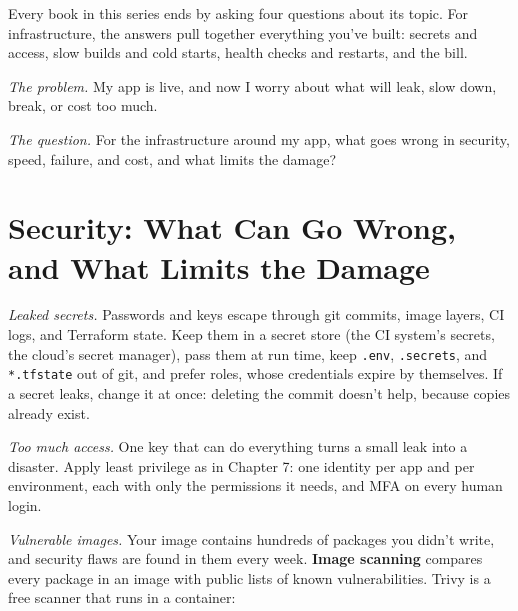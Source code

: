 
\begin{chapterintro}

Every book in this series ends by asking four questions about its topic. For infrastructure, the answers pull together everything you've built: secrets and access, slow builds and cold starts, health checks and restarts, and the bill.

\end{chapterintro}

\emph{The problem.} My app is live, and now I worry about what will leak, slow down, break, or cost too much.

\emph{The question.} For the infrastructure around my app, what goes wrong in security, speed, failure, and cost, and what limits the damage?

\section{Security: What Can Go Wrong, and What Limits the Damage}\label{12-security-speed-failure-and-cost:security-what-can-go-wrong-and-what-limits-the-damage}

\emph{Leaked secrets.} Passwords and keys escape through git commits, image layers, CI logs, and Terraform state. Keep them in a secret store (the CI system's secrets, the cloud's secret manager), pass them at run time, keep \texttt{.env}, \texttt{.secrets}, and \texttt{*.tfstate} out of git, and prefer roles, whose credentials expire by themselves. If a secret leaks, change it at once: deleting the commit doesn't help, because copies already exist.

\emph{Too much access.} One key that can do everything turns a small leak into a disaster. Apply least privilege as in Chapter 7: one identity per app and per environment, each with only the permissions it needs, and MFA on every human login.

\emph{Vulnerable images.} Your image contains hundreds of packages you didn't write, and security flaws are found in them every week. \textbf{Image scanning} compares every package in an image with public lists of known vulnerabilities. Trivy is a free scanner that runs in a container:

